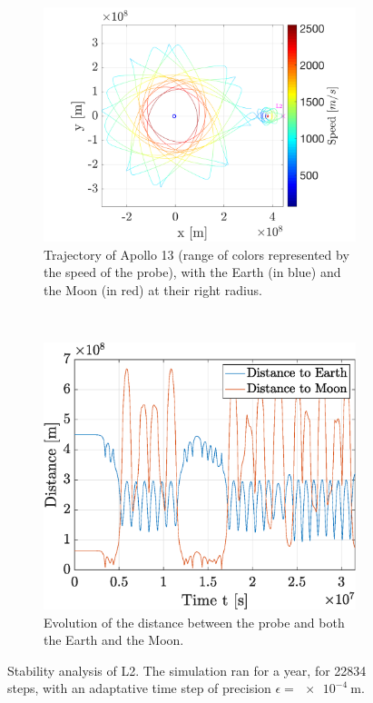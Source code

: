\documentclass[a4paper,12pt,twoside]{article}
\begin{document}
\begin{figure}[h]
  \centering
  \begin{subfigure}[t]{0.55\textwidth}
    \includegraphics[width=\textwidth]{graphs/ex7b_L2_traj.png}
    \caption{Trajectory of Apollo 13 (range of colors represented by the speed of the probe), with the Earth (in blue) and the Moon (in red) at their right radius.}
    \label{fig:7b_L2_traj}
  \end{subfigure}
  ~
  \begin{subfigure}[t]{0.4\textwidth}
    \includegraphics[width=\textwidth]{graphs/ex7b_L2_dist.eps}
    \caption{Evolution of the distance between the probe and both the Earth and the Moon.}
    \label{fig:7b_L2_dist}
  \end{subfigure}
  \caption{Stability analysis of L2. The simulation ran for a year, for \num{22834} steps, with an adaptative time step of precision $\epsilon = \SI{e-4}{\m}$.}
  \label{fig:7b_L2}
\end{figure}
\end{document}
